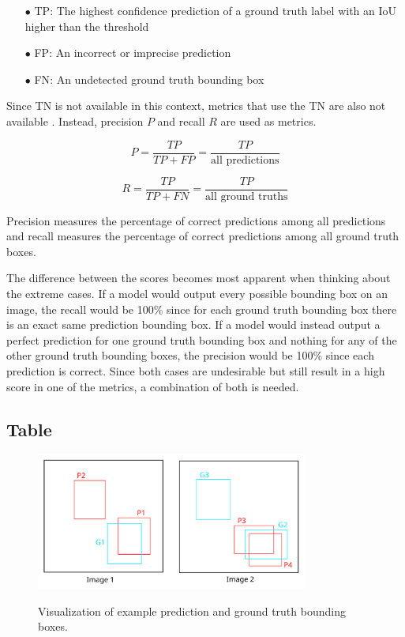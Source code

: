 \documentclass[10pt]{book}
\begin{document}
\begin{itemize}
  \item[$\bullet$] \ac{TP}: The highest confidence prediction of a ground truth label with an \ac{IoU} higher than the threshold
  \item[$\bullet$] \ac{FP}: An incorrect or imprecise prediction
  \item[$\bullet$] \ac{FN}: An undetected ground truth bounding box
\end{itemize}

Since \ac{TN} is not available in this context, metrics that use the \ac{TN} are also not available \cite{padilla2020survey}. Instead, precision $P$ and recall $R$ are used as metrics.

$$P = \frac{TP}{TP + FP} = \frac{TP}{\text{all predictions}}$$

$$R = \frac{TP}{TP + FN} = \frac{TP}{\text{all ground truths}}$$

Precision measures the percentage of correct predictions among all predictions and recall measures the percentage of correct predictions among all ground truth boxes. 

The difference between the scores becomes most apparent when thinking about the extreme cases. If a model would output every possible bounding box on an image, the recall would be 100\% since for each ground truth bounding box there is an exact same prediction bounding box. If a model would instead output a perfect prediction for one ground truth bounding box and nothing for any of the other ground truth bounding boxes, the precision would be 100\% since each prediction is correct. Since both cases are undesirable but still result in a high score in one of the metrics, a combination of both is needed.

\subsection{Table}

\begin{figure}
  \caption{Visualization of example prediction and ground truth bounding boxes.}
  \includegraphics[width=0.8\textwidth]{image/preds}
  \label{fig:preds}
\end{figure}
\end{document}
